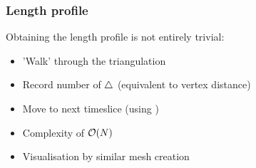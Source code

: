 \begin{frame}
    \frametitle{Length profile}

    Obtaining the length profile is not entirely trivial:
    \begin{itemize}
        \item 'Walk' through the triangulation
        \item Record number of $\bigtriangleup$ (equivalent to vertex distance)
        \item Move to next timeslice (using \tdown)
        \item Complexity of $\order{N}$ \\[3mm]%
        \item Visualisation by similar mesh creation
    \end{itemize}
\end{frame}
